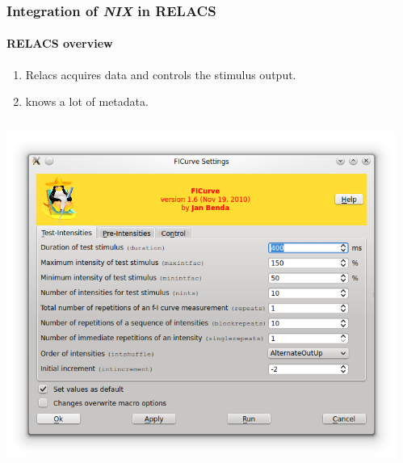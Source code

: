 \documentclass[pdftex, xcolor=table]{beamer}
\newcommand{\nix}{\textit{NIX}}
\begin{document}
\begin{frame}
  \frametitle{Integration of \nix{} in RELACS}
  \framesubtitle{RELACS overview}
  \begin{enumerate}
  \item Relacs acquires data and controls the stimulus output.
  \item knows a lot of metadata.
  \end{enumerate}
  \begin{columns}
    \begin{column}{6cm}
      \includegraphics[width=\columnwidth]{images/relacs_ephys_options}
    \end{column}
    \begin{column}{6cm}

\end{column}
\end{columns}
\end{frame}
\end{document}
